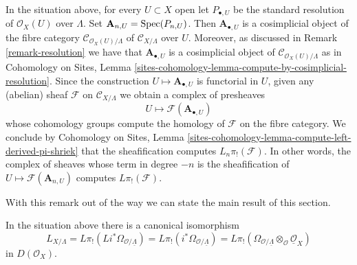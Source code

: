 \begin{remark}
\label{remark-compute-L-pi-shriek}
In the situation above, for every $U \subset X$ open let
$P_{\bullet, U}$ be the standard resolution of $\mathcal{O}_X(U)$
over $\Lambda$. Set $\mathbf{A}_{n, U} = \mathop{\mathrm{Spec}}(P_{n, U})$. Then
$\mathbf{A}_{\bullet, U}$
is a cosimplicial object of the fibre category
$\mathcal{C}_{\mathcal{O}_X(U)/\Lambda}$ of
$\mathcal{C}_{X/\Lambda}$ over $U$. Moreover, as discussed
in Remark \ref{remark-resolution} we have that $\mathbf{A}_{\bullet, U}$
is a cosimplicial object of $\mathcal{C}_{\mathcal{O}_X(U)/\Lambda}$
as in Cohomology on Sites, Lemma
\ref{sites-cohomology-lemma-compute-by-cosimplicial-resolution}.
Since the construction $U \mapsto \mathbf{A}_{\bullet, U}$ is functorial
in $U$, given any (abelian) sheaf $\mathcal{F}$ on $\mathcal{C}_{X/\Lambda}$
we obtain a complex of presheaves
$$
U \longmapsto \mathcal{F}(\mathbf{A}_{\bullet, U})
$$
whose cohomology groups compute the homology of $\mathcal{F}$ on the fibre
category. We conclude by
Cohomology on Sites, Lemma
\ref{sites-cohomology-lemma-compute-left-derived-pi-shriek}
that the sheafification computes $L_n\pi_!(\mathcal{F})$.
In other words, the complex of sheaves whose term in degree $-n$ is
the sheafification of $U \mapsto \mathcal{F}(\mathbf{A}_{n, U})$ computes
$L\pi_!(\mathcal{F})$.
\end{remark}

\noindent
With this remark out of the way we can state the main
result of this section.

\begin{lemma}
\label{lemma-cotangent-morphism-schemes}
In the situation above there is a canonical isomorphism
$$
L_{X/\Lambda} = 
L\pi_!(Li^*\Omega_{\mathcal{O}/\underline{\Lambda}}) =
L\pi_!(i^*\Omega_{\mathcal{O}/\underline{\Lambda}}) =
L\pi_!(\Omega_{\mathcal{O}/\underline{\Lambda}}
\otimes_\mathcal{O} \underline{\mathcal{O}}_X)
$$
in $D(\mathcal{O}_X)$.
\end{lemma}

